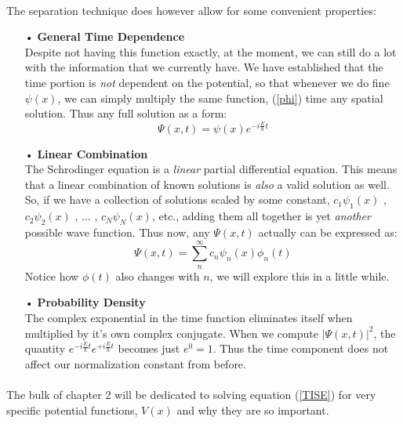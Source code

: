 \documentclass[12pt,letterpaper]{book}
\begin{document}
\paragraph*{}The separation technique does however allow for some convenient properties:
\begin{enumerate}
\item[•]\textbf{General Time Dependence}\\
Despite not having this function exactly, at the moment, we can still do a lot with the information that we currently have. We have established that the time portion is \textit{not} dependent on the potential, so that whenever we do fine $\psi(x)$, we can simply multiply the same function, (\ref{phi}) time any spatial solution. Thus any full solution as a form:
\begin{equation}
\Psi(x,t) = \psi(x)e^{-i\frac{E}{\hbar}t}
\end{equation}
\item[•]\textbf{Linear Combination}\\
The Schrodinger equation is a \textit{linear} partial differential equation. This means that a linear combination of known solutions is \textit{also} a valid solution as well. So, if we have a collection of solutions scaled by some constant,
$c_1\psi_1(x)$ , $c_2\psi_2(x)$ , ... , $c_N\psi_N(x)$, etc., adding them all together is yet \textit{another} possible wave function. Thus now, any $\Psi(x,t)$ actually can be expressed as:
\begin{equation}
\label{linear combo}
\Psi(x,t) = \sum_n^{\infty} c_n \psi_n(x) \phi_n(t)
\end{equation}
Notice how $\phi(t)$ also changes with $n$, we will explore this in a little while. 
\item[•]\textbf{Probability Density}\\
The complex exponential in the time function eliminates itself when multiplied by it's own complex conjugate. When we compute $\big | \Psi(x,t) \big|^2$, the quantity $e^{-i\frac{E}{\hbar}t}e^{+i\frac{E}{\hbar}t}$ becomes just $e^0 = 1$. Thus the time component does not affect our normalization constant from before. 
\end{enumerate}

\paragraph*{}The bulk of chapter 2 will be dedicated to solving equation (\ref{TISE}) for very specific potential functions, $V(x)$ and why they are so important. 
\end{document}
